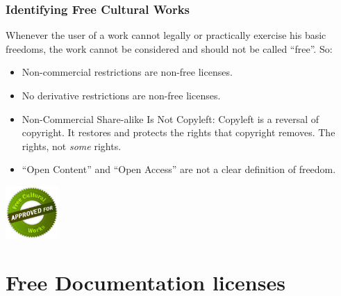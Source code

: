 \documentclass{beamer}
\begin{document}
\begin{frame}
\frametitle{Identifying Free Cultural Works}

Whenever the user of a work cannot legally or practically exercise his basic freedoms, the work cannot be considered and should not be called ``free''. So: 

\begin{itemize}
\item \alert{Non-commercial} restrictions are \alert{non-free} licenses.
\item \alert{No derivative} restrictions are \alert{non-free} licenses. 
\item \alert{Non-Commercial Share-alike} Is Not Copyleft: Copyleft is a reversal of copyright. It restores and protects the rights that copyright removes. \alert{The} rights, not \textit{some} rights.
\item ``Open Content'' and ``Open Access'' are \alert{not} a clear definition of freedom. 
\end{itemize}                                                 

\begin{center}
\includegraphics[width=2cm]{figs/seal.png}

\end{center}


\end{frame}



\section{Free Documentation licenses}
\end{document}
